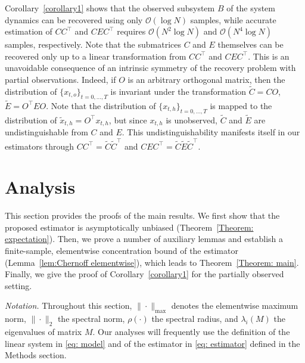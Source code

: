 \documentclass[11pt]{article}
\begin{document}
Corollary~\ref{corollary1} shows that the observed subsystem $B$ of the system dynamics can be recovered using only $\mathcal{O}(\log N)$ samples, while accurate estimation of $CC^\top$ and $CEC^\top$ requires $\mathcal{O}(N^2\log N)$ and $\mathcal{O}(N^4\log N)$ samples, respectively. Note that the submatrices $C$ and $E$ themselves can be recovered only up to a linear transformation from $CC^\top$ and $CEC^\top$. This is an unavoidable consequence of an intrinsic symmetry of the recovery problem with partial observations. Indeed, if $O$ is an arbitrary orthogonal matrix, then the distribution of $\{x_{t,o}\}_{t=0,\dots,T}$ is invariant under the transformation $\tilde{C}=CO$, $\tilde{E}=O^\top EO$. Note that the distribution of $\{x_{t,h}\}_{t=0,\dots,T}$ is mapped to the distribution of $\tilde{x}_{t,h}= O^{\top}x_{t,h}$, but since $x_{t,h}$ is unobserved, $\tilde{C}$ and $\tilde{E}$ are undistinguishable from $C$ and $E$. This undistinguishability manifests itself in our estimators through $CC^\top = \tilde{C}\tilde{C}^\top$ and $CEC^\top = \tilde{C}\tilde{E}\tilde{C}^\top$.





\section{Analysis}
\label{sec:analysis}

This section provides the proofs of the main results. We first show that the proposed estimator is asymptotically unbiased (Theorem~\ref{Theorem: expectation}). Then, we prove a number of auxiliary lemmas and establish a finite-sample, elementwise concentration bound of the estimator (Lemma~\ref{lem:Chernoff elementwise}), which leads to Theorem~\ref{Theorem: main}. Finally, we give the proof of Corollary~\ref{corollary1} for the partially observed setting.

\medskip
\noindent\textit{Notation.} Throughout this section, $\|\cdot\|_{\max}$ denotes the elementwise maximum norm, $\|\cdot\|_2$ the spectral norm, $\rho(\cdot)$ the spectral radius, and $\lambda_i(M)$ the eigenvalues of matrix $M$. Our analyses will frequently use the definition of the linear system in \eqref{eq: model} and of the estimator in \eqref{eq: estimator} defined in the Methods section.
\end{document}
